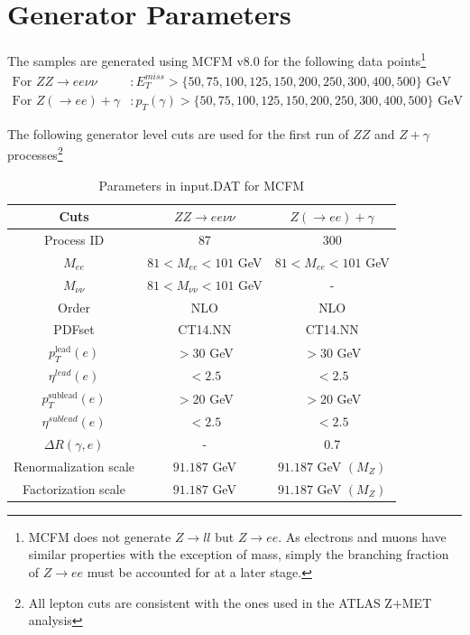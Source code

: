 \documentclass[11pt,a4paper,final]{report}
\begin{document}
\section{Generator Parameters}
The samples are generated using MCFM v8.0 for the following data points\footnote{MCFM does not generate $Z\rightarrow ll$ but $Z\rightarrow ee$. As electrons and muons have similar properties with the exception of mass, simply the branching fraction of $Z\rightarrow ee$ must be accounted for at a later stage.}
\begin{align*}
	\text{For } ZZ \rightarrow ee\nu\nu &: E_T^{miss} > \{50,75,100,125,150,200,250,300,400,500\}\text{ GeV} \\
	\text{For } Z(\rightarrow ee)+\gamma &: p_T(\gamma) > \{50,75,100,125,150,200,250,300,400,500\}\text{ GeV}
\end{align*}

The following generator level cuts are used for the first run of $ZZ$ and $Z+\gamma$ processes\footnote{All lepton cuts are consistent with the ones used in the ATLAS Z+MET analysis}
\begin{table}[H]
\begin{center}
	\begin{tabular}{|c|c|c|}
	\hline
	\textbf{Cuts} &$ZZ \rightarrow ee\nu\nu$ & $Z(\rightarrow ee)+\gamma$\\
	\hline
	Process ID & 87 & 300\\
	$M_{ee}$ & $81 < M_{ee} < 101$ GeV & $81 < M_{ee} < 101$ GeV\\
	$M_{\nu\nu}$ & $81 < M_{\nu\nu} < 101$ GeV& -\\
	Order & NLO & NLO\\
	PDFset & CT14.NN & CT14.NN\\
	$p_T^{\text{lead}}(e)$ & $> 30$ GeV & $> 30$ GeV\\
	$\eta^{lead}(e)$ & $< 2.5$ & $< 2.5$\\
	$p_T^{\text{sublead}}(e)$ & $> 20$ GeV & $> 20$ GeV\\
	$\eta^{sublead}(e)$ & $< 2.5$ & $< 2.5$\\
	$\Delta R(\gamma,e)$ & - & 0.7\\
	Renormalization scale & $91.187$ GeV & $91.187$ GeV $(M_{Z})$\\
	Factorization scale & $91.187$ GeV & $91.187$ GeV $(M_{Z})$\\
	\hline
	\end{tabular}
	\caption{Parameters in input.DAT for MCFM}
	\label{table:default}
	\end{center}
\end{table}
\end{document}
